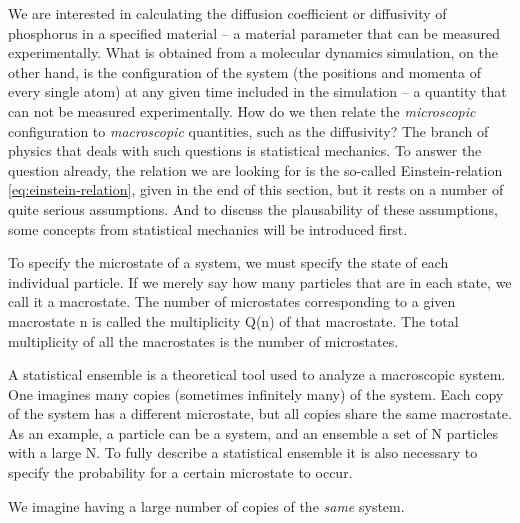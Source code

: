 \documentclass[11pt,bibliography=totoc,index=totoc]{scrbook}   %
\begin{document}
We are interested in calculating the diffusion coefficient or diffusivity of phosphorus in a specified material -- 
a material parameter that can be measured experimentally.
What is obtained from a molecular dynamics simulation, on the other hand, is the configuration of the system (the positions and momenta of every single atom) at any given time included in the simulation -- a quantity that can not be measured experimentally. 
How do we then relate the \emph{microscopic} configuration to \emph{macroscopic} quantities, such as the diffusivity?
The branch of physics that deals with such questions is statistical mechanics. 
To answer the question already, the relation we are looking for is the so-called Einstein-relation \eqref{eq:einstein-relation}, given in the end of this section, but it rests on a number of quite serious assumptions. 
And to discuss the plausability of these assumptions, some concepts from statistical mechanics will be introduced first.

To specify the microstate of a system, we must specify the state of each individual particle. If we merely say how many particles that are in each state, we call it a macrostate. The number of microstates corresponding to a given macrostate n is called the multiplicity Q(n) of that macrostate. The total multiplicity of all the macrostates is the number of microstates.



A statistical ensemble is a theoretical tool used to analyze a macroscopic system. One imagines many copies (sometimes infinitely many) of the system. Each copy of the system has a different microstate, but all copies share the same macrostate. As an example, a particle can be a system, and an ensemble a set of N particles with a large N.
To fully describe a statistical ensemble it is also necessary to specify the probability for a certain microstate to occur.


We imagine having a large number of copies of the \emph{same} system. 
\end{document}
